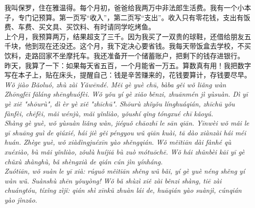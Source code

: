 \documentclass[11pt]{article}
\begin{document}
\begin{textebox}
我叫保罗，住在雅温得。每个月初，爸爸给我两万中非法郎生活费。我有一个小本子，专门记预算。第一页写“收入”，第二页写“支出”。收入只有零花钱，支出有饭费、车费、买文具、买饮料、有时请同学吃烤鱼。\\
上个月，我预算两万，结果超支了三千。因为我买了一双贵的球鞋，还借给朋友五千块，他到现在还没还。这个月，我下定决心要省钱。我每天带饭盒去学校，不买饮料，走路回家不坐摩托车。我还准备开一个储蓄账户，把剩下的钱存进银行。\\
昨天，我算了一下：如果每天省五百，一个月能省一万五。算数真有用！我把数字写在本子上，贴在床头，提醒自己：钱是辛苦赚来的，花钱要算计，存钱要尽早。\\
\emph{Wǒ jiào Bǎoluó, zhù zài Yǎwēndé. Měi gè yuè chū, bàba gěi wǒ liǎng wàn Zhōngfēi fǎláng shēnghuófèi. Wǒ yǒu yí gè xiǎo běnzi, zhuānmén jì yùsuàn. Dì yī yè xiě "shōurù", dì èr yè xiě "zhīchū". Shōurù zhǐyǒu línghuáqián, zhīchū yǒu fànfèi, chēfèi, mǎi wénjù, mǎi yǐnliào, yǒushí qǐng tóngxué chī kǎoyú.}\\\emph{Shàng gè yuè, wǒ yùsuàn liǎng wàn, jiéguǒ chāozhī le sān qiān. Yīnwèi wǒ mǎi le yī shuāng guì de qiúxié, hái jiè gěi péngyou wǔ qiān kuài, tā dào xiànzài hái méi huán. Zhège yuè, wǒ xiàdìngjuéxīn yào shěngqián. Wǒ měitiān dài fànhé qù xuéxiào, bù mǎi yǐnliào, zǒulù huíjiā bù zuò mótuōchē. Wǒ hái zhǔnbèi kāi yī gè chǔxù zhànghù, bǎ shèngxià de qián cún jìn yínháng.}\\\emph{Zuótiān, wǒ suàn le yī xià: rúguǒ měitiān shěng wǔ bǎi, yí gè yuè néng shěng yí wàn wǔ. Suànshù zhēn yǒuyòng! Wǒ bǎ shùzì xiě zài běnzi shàng, tiē zài chuángtóu, tíxǐng zìjǐ: qián shì xīnkǔ zhuàn lái de, huāqián yào suànjì, cúnqián yào jìnzǎo.}
\end{textebox}
\end{document}
